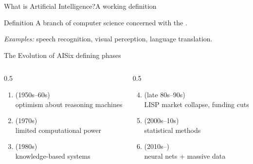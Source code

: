 \documentclass[aspectratio=169,11pt]{beamer}
\begin{document}
\begin{frame}{What is Artificial Intelligence?}{A working definition}
  \begin{block}{Definition}
    A branch of computer science concerned with the
    .
  \end{block}
  \begin{center}
  \end{center}
  \begin{center}\small\textit{Examples:} speech recognition, visual perception, language translation.\end{center}
\end{frame}

\begin{frame}{The Evolution of AI}{Six defining phases}
  \begin{columns}[T]
    \begin{column}{0.5\textwidth}
      \begin{enumerate}
        \item {} (1950s–60s) \\ \small optimism about reasoning machines
        \item {} (1970s) \\ \small limited computational power
        \item {} (1980s) \\ \small knowledge-based systems
      \end{enumerate}
    \end{column}
    \begin{column}{0.5\textwidth}
      \begin{enumerate}\setcounter{enumi}{3}
        \item {} (late 80s–90s) \\ \small LISP market collapse, funding cuts
        \item {} (2000s–10s) \\ \small statistical methods
        \item {} (2010s–) \\ \small neural nets + massive data
      \end{enumerate}
    \end{column}
  \end{columns}
\end{frame}
\end{document}
